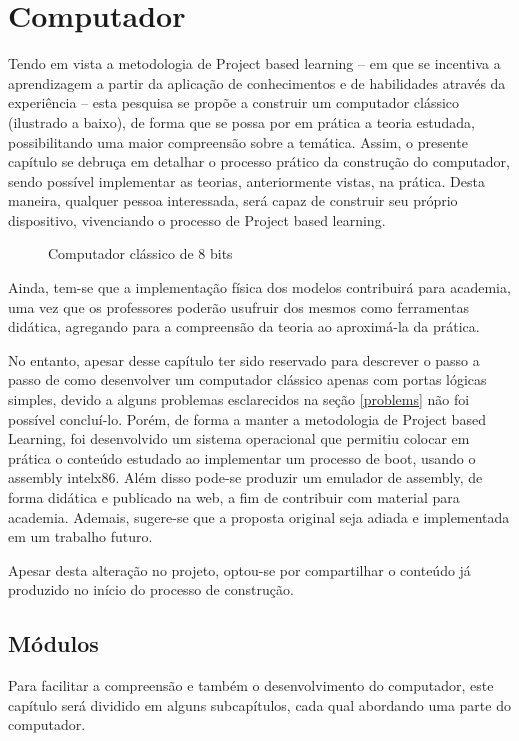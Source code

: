 \section{Computador} 
Tendo em vista a metodologia de Project based learning – em que se incentiva a aprendizagem a partir da aplicação de conhecimentos e de habilidades através da experiência – esta pesquisa se propõe a construir um computador clássico (ilustrado a baixo), de forma que se possa por em prática a teoria estudada, possibilitando uma maior compreensão sobre a temática. Assim, o presente capítulo se debruça em detalhar o processo prático da construção do computador, sendo possível implementar as teorias, anteriormente vistas, na prática. Desta maneira, qualquer pessoa interessada, será capaz de construir seu próprio dispositivo, vivenciando o processo de Project based learning. 

\vspace{1cm}
\begin{figure}[H] \centering 
  \caption{\label{breadboard_computer} Computador clássico de 8 bits} 
\end{figure}

Ainda, tem-se que a implementação física dos modelos contribuirá para academia, uma vez que os professores poderão usufruir dos mesmos como ferramentas didática, agregando para a compreensão da teoria ao aproximá-la da prática. 

No entanto, apesar desse capítulo ter sido reservado para descrever o passo a passo de como desenvolver um computador clássico apenas com portas lógicas simples, devido a alguns problemas esclarecidos na seção \ref{problems} não foi possível concluí-lo. Porém, de forma a manter a metodologia de Project based Learning, foi desenvolvido um sistema operacional que permitiu colocar em prática o conteúdo estudado ao implementar um processo de boot, usando o assembly intelx86. Além disso pode-se produzir um emulador de assembly, de forma didática e publicado na web,  a fim de contribuir com material para academia. Ademais, sugere-se que a proposta original seja adiada e implementada em um trabalho futuro. 

Apesar desta alteração no projeto, optou-se por compartilhar o conteúdo já produzido no início do processo de construção. 

\subsection{Módulos}
Para facilitar a compreensão e também o desenvolvimento do computador, este capítulo será dividido em alguns subcapítulos, cada qual abordando uma parte do computador.

